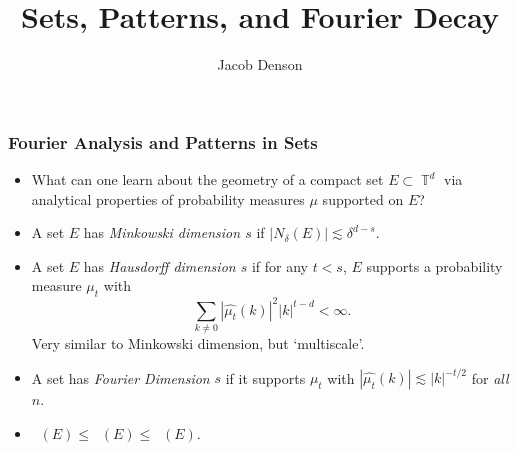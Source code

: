 \documentclass[handout,usenames,dvipsnames]{beamer}
\title{Sets, Patterns, and Fourier Decay}
\author{Jacob Denson}
\institute{}
\DeclareMathOperator{\TT}{\mathbb{T}}
\DeclareMathOperator{\fordim}{\text{dim}_{\mathbb{F}}}
\DeclareMathOperator{\hausdim}{\text{dim}_{\mathbb{H}}}
\DeclareMathOperator{\minkdim}{\text{dim}_{\mathbb{M}}}
\begin{document}
\maketitle

\begin{frame}
    \frametitle{Fourier Analysis and Patterns in Sets}

    \begin{itemize}
        \item What can one learn about the geometry of a compact set $E \subset \TT^d$ via analytical properties of probability measures $\mu$ supported on $E$?
        \pause

        \item A set $E$ has \emph{Minkowski dimension $s$} if $|N_\delta(E)| \lesssim \delta^{d-s}$.
        \pause

        \item A set $E$ has \emph{Hausdorff dimension $s$} if for any $t < s$, $E$ supports a probability measure $\mu_t$ with
        \[ \sum_{k \neq 0} |\widehat{\mu_t}(k)|^2 |k|^{t-d} < \infty. \]
        Very similar to Minkowski dimension, but `multiscale'.
        \pause

        \item A set has \emph{Fourier Dimension} $s$ if it supports $\mu_t$ with $|\widehat{\mu_t}(k)| \lesssim |k|^{-t/2}$ for \emph{all} $n$.

        \item $\fordim(E) \leq \hausdim(E) \leq \minkdim(E)$.
    \end{itemize}
\end{frame}
\end{document}
